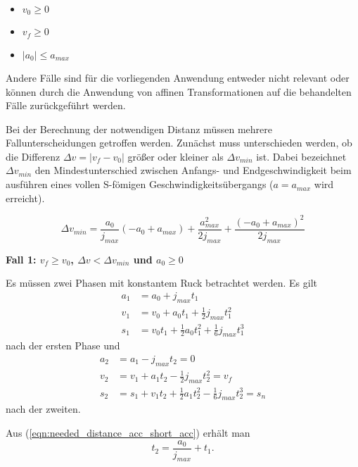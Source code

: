 \begin{itemize}
\item $v_0 \ge 0$
\item $v_f \ge 0$
\item $|a_0| \le a_{max}$
\end{itemize}

Andere Fälle sind für die vorliegenden Anwendung entweder nicht relevant oder können durch die Anwendung von affinen Transformationen auf die behandelten Fälle zurückgeführt werden.

Bei der Berechnung der notwendigen Distanz müssen mehrere Fallunterscheidungen getroffen werden. Zunächst muss unterschieden werden, ob die Differenz $\Delta v = |v_f - v_0|$ größer oder kleiner als $\Delta v_{min}$ ist. Dabei bezeichnet $\Delta v_{min}$ den Mindestunterschied zwischen Anfangs- und Endgeschwindigkeit beim ausführen eines vollen S-fömigen Geschwindigkeitsübergangs ($a = a_{max}$ wird erreicht). 

\begin{equation}
\Delta v_{min} = \frac{a_{0}}{j_{{max}}} \left(- a_{0} + a_{{max}}\right) + \frac{a_{{max}}^{2}}{2 j_{{max}}} + \frac{\left(- a_{0} + a_{{max}}\right)^{2}}{2 j_{{max}}}
\end{equation}

\textbf{Fall 1: $v_f \ge v_0$,  $\Delta v < \Delta v_{min}$ und $a_0 \ge 0$}

Es müssen zwei Phasen mit konstantem Ruck betrachtet werden. Es gilt
\begin{align}
a_1 &= a_0 + j_{max}t_1  \\ 
v_1 &= v_0 + a_0t_1 + \frac{1}{2}j_{max}t_1^2 \\
s_1 &= v_0t_1 + \frac{1}{2}a_{0}t_1^2 + \frac{1}{6}j_{max}t_1^3
\end{align}
nach der ersten Phase und 
\begin{align}
\label{eqn:needed_distance_acc_short_acc}
a_2 &= a_1 - j_{max}t_2 = 0 \\
\label{eqn:needed_distance_acc_short_vel}
v_2 &= v_1 + a_1t_2 - \frac{1}{2}j_{max}t_2^2 = v_f \\
\label{eqn:needed_distance_acc_short_pos}
s_2 &= s_1 + v_1t_2 + \frac{1}{2}a_1t_2^2 - \frac{1}{6}j_{max}t_2^3 = s_n
\end{align}
nach der zweiten.

Aus (\ref{eqn:needed_distance_acc_short_acc}) erhält man
\begin{equation}
\label{eqn:needed_distance_acc_short_t2}
t_2 = \frac{a_{0}}{j_{{max}}} + t_{1}.
\end{equation}

